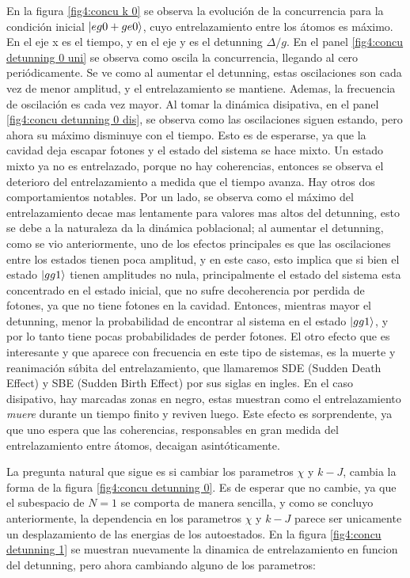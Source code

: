 En la figura \ref{fig4:concu k 0} se observa la evolución de la concurrencia para la condición inicial $\ket{eg0+ge0}$, cuyo entrelazamiento entre los átomos es máximo. En el eje x es el tiempo, y en el eje y es el detunning $\Delta/g$. En el panel \ref{fig4:concu detunning 0 uni} se observa como oscila la concurrencia, llegando al cero periódicamente. Se ve como al aumentar el detunning, estas oscilaciones son cada vez de menor amplitud, y el entrelazamiento se mantiene. Ademas, la frecuencia de oscilación es cada vez mayor. Al tomar la dinámica disipativa, en el panel \ref{fig4:concu detunning 0 dis}, se observa como las oscilaciones siguen estando, pero ahora su máximo disminuye con el tiempo. Esto es de esperarse, ya que la cavidad deja escapar fotones y el estado del sistema se hace mixto. Un estado mixto ya no es entrelazado, porque no hay coherencias, entonces se observa el deterioro del entrelazamiento a medida que el tiempo avanza. Hay otros dos comportamientos notables. Por un lado, se observa como el máximo del entrelazamiento decae mas lentamente para valores mas altos del detunning, esto se debe a la naturaleza da la dinámica poblacional; al aumentar el detunning, como se vio anteriormente, uno de los efectos principales es que las oscilaciones entre los estados tienen poca amplitud, y en este caso, esto implica que si bien el estado $\ket{gg1}$ tienen amplitudes no nula, principalmente el estado del sistema esta concentrado en el estado inicial, que no sufre decoherencia por perdida de fotones, ya que no tiene fotones en la cavidad. Entonces, mientras mayor el detunning, menor la probabilidad de encontrar al sistema en el estado $\ket{gg1}$, y por lo tanto tiene pocas probabilidades de perder fotones. El otro efecto que es interesante y que aparece con frecuencia en este tipo de sistemas, es la muerte y reanimación súbita del entrelazamiento, que llamaremos SDE (Sudden Death Effect) y SBE (Sudden Birth Effect) por sus siglas en ingles. En el caso disipativo, hay marcadas zonas en negro, estas muestran como el entrelazamiento \textit{muere} durante un tiempo finito y reviven luego. Este efecto es sorprendente, ya que uno espera que las coherencias, responsables en gran medida del entrelazamiento entre átomos, decaigan asintóticamente. 

La pregunta natural que sigue es si cambiar los parametros $\chi$ y $k-J$, cambia la forma de la figura \ref{fig4:concu detunning 0}. Es de esperar que no cambie, ya que el subespacio de $N=1$ se comporta de manera sencilla, y como se concluyo anteriormente, la dependencia en los parametros $\chi$ y $k-J$ parece ser unicamente un desplazamiento de las energias de los autoestados. En la figura \ref{fig4:concu detunning 1} se muestran nuevamente la dinamica de entrelazamiento en funcion del detunning, pero ahora cambiando alguno de los parametros:

